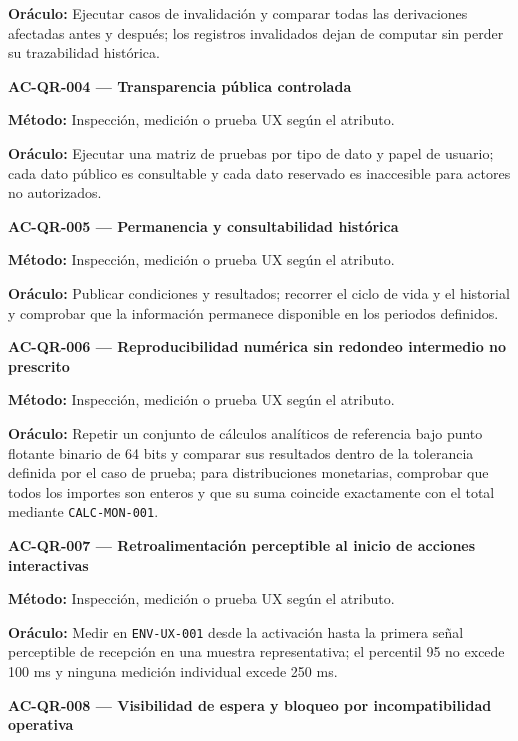 \documentclass[10pt,letterpaper]{article}
\begin{document}
\textbf{Oráculo:} Ejecutar casos de invalidación y comparar todas las derivaciones afectadas antes y después; los registros invalidados dejan de computar sin perder su trazabilidad histórica.\par\vspace{0.45em}
\noindent\textbf{AC-QR-004 --- Transparencia pública controlada}\par
\textbf{Método:} Inspección, medición o prueba UX según el atributo.\par
\textbf{Oráculo:} Ejecutar una matriz de pruebas por tipo de dato y papel de usuario; cada dato público es consultable y cada dato reservado es inaccesible para actores no autorizados.\par\vspace{0.45em}
\noindent\textbf{AC-QR-005 --- Permanencia y consultabilidad histórica}\par
\textbf{Método:} Inspección, medición o prueba UX según el atributo.\par
\textbf{Oráculo:} Publicar condiciones y resultados; recorrer el ciclo de vida y el historial y comprobar que la información permanece disponible en los periodos definidos.\par\vspace{0.45em}
\noindent\textbf{AC-QR-006 --- Reproducibilidad numérica sin redondeo intermedio no prescrito}\par
\textbf{Método:} Inspección, medición o prueba UX según el atributo.\par
\textbf{Oráculo:} Repetir un conjunto de cálculos analíticos de referencia bajo punto flotante binario de 64 bits y comparar sus resultados dentro de la tolerancia definida por el caso de prueba; para distribuciones monetarias, comprobar que todos los importes son enteros y que su suma coincide exactamente con el total mediante \texttt{CALC-MON-001}.\par\vspace{0.45em}
\noindent\textbf{AC-QR-007 --- Retroalimentación perceptible al inicio de acciones interactivas}\par
\textbf{Método:} Inspección, medición o prueba UX según el atributo.\par
\textbf{Oráculo:} Medir en \texttt{ENV-UX-001} desde la activación hasta la primera señal perceptible de recepción en una muestra representativa; el percentil 95 no excede 100 ms y ninguna medición individual excede 250 ms.\par\vspace{0.45em}
\noindent\textbf{AC-QR-008 --- Visibilidad de espera y bloqueo por incompatibilidad operativa}\par
\end{document}
